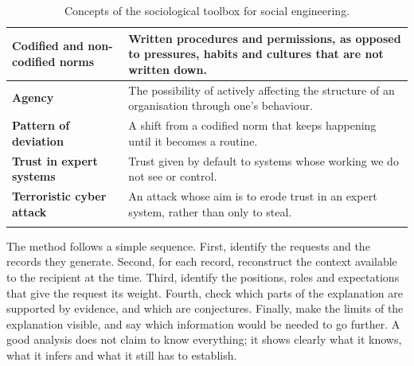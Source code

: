 \begin{table}[htbp]
\begin{tabular}{@{}>{\raggedright\arraybackslash}p{} >{\raggedright\arraybackslash}p{}@{}}
			\hline
			\textbf{Codified and non-codified norms} & Written procedures and permissions, as opposed to pressures, habits and cultures that are not written down. \\
			\hline
			\textbf{Agency} & The possibility of actively affecting the structure of an organisation through one's behaviour. \\
			\hline
			\textbf{Pattern of deviation} & A shift from a codified norm that keeps happening until it becomes a routine. \\
			\hline
			\textbf{Trust in expert systems} & Trust given by default to systems whose working we do not see or control. \\
			\hline
			\textbf{Terroristic cyber attack} & An attack whose aim is to erode trust in an expert system, rather than only to steal. \\
		\arrayrulecolor{black!70}\hline
	\end{tabular}
	\caption{Concepts of the sociological toolbox for social engineering.}
	\label{tab:se-concepts}
\end{table}
 
The method follows a simple sequence. First, identify the requests and the records they generate. Second, for each record, reconstruct the context available to the recipient at the time. Third, identify the positions, roles and expectations that give the request its weight. Fourth, check which parts of the explanation are supported by evidence, and which are conjectures. Finally, make the limits of the explanation visible, and say which information would be needed to go further. A good analysis does not claim to know everything; it shows clearly what it knows, what it infers and what it still has to establish.
